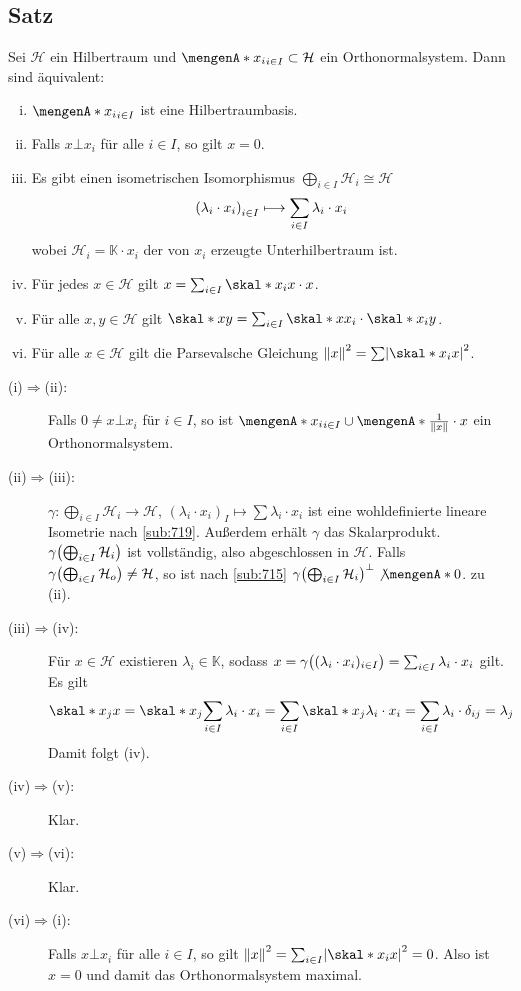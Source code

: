 \subsection{Satz} %
\label{sub:722}
Sei $\mathcal{H}$ ein Hilbertraum und $\set{x_i}_{i \in I} \subset \mathcal{H}$ ein Orthonormalsystem. Dann sind äquivalent: 
\begin{enumerate}[(i)]
	\item $\set{x_i}_{i \in I}$ ist eine Hilbertraumbasis. 
	\item Falls $x \bot x_i$ für alle $i \in I$, so gilt $x=0$.
	\item Es gibt einen isometrischen Isomorphismus $\bigoplus_{i \in I} \mathcal{H}_i \cong \mathcal{H}$ 
	\[
		\enbrace*{\lambda_i \cdot x_i}_{i \in I} \longmapsto \sum_{i \in I} \lambda_i \cdot x_i 
	\]
	wobei $\mathcal{H}_i = \mathds{K} \cdot x_i$ der von $x_i$ erzeugte Unterhilbertraum ist.
	\item Für jedes $x \in \mathcal{H}$ gilt $x= \sum_{i \in I} \skal*{x_i}{x} \cdot x$.
	\item Für alle $x,y \in \mathcal{H}$ gilt $\skal*{x}{y} = \sum_{i \in I} \skal*{x}{x_i} \cdot \skal*{x_i}{y}$.
	\item Für alle $x \in \mathcal{H}$ gilt die Parsevalsche Gleichung $\norm{x}^2 = \sum \abs*{\skal*{x_i}{x}}^2$.
\end{enumerate}
\begin{description}
	\item[(i)$\Rightarrow$(ii):] Falls $0 \not= x \bot x_i$ für $i \in I$, so ist $\set{x_i}_{i \in I} \cup \set{\frac{1}{\norm{x}} \cdot x}$ ein Orthonormalsystem. \light
	\item[(ii)$\Rightarrow$(iii):] $\gamma \colon \bigoplus_{i \in I} \mathcal{H}_i \to \mathcal{H}$, $(\lambda_i \cdot x_i)_I \mapsto \sum \lambda_i \cdot x_i$ ist eine
	wohldefinierte lineare Isometrie nach \ref{sub:719}. Außerdem erhält $\gamma$ das Skalarprodukt. $\gamma \enbrace*{\bigoplus_{i \in I} \mathcal{H}_i}$ ist vollständig,
	also abgeschlossen in $\mathcal{H}$. Falls $\gamma \enbrace*{\bigoplus_{i\in I} \mathcal{H}_o} \not= \mathcal{H}$, so ist nach \ref{sub:715} 
	$\gamma \enbrace*{\bigoplus_{i \in I} \mathcal{H}_i}^\bot \not \set{0}$. \light zu (ii). 
	\item[(iii)$\Rightarrow$(iv):] Für $x \in \mathcal{H}$ existieren $\lambda_i \in \mathds{K}$,  sodass 
	$x= \gamma \enbrace[\big]{(\lambda_i \cdot x_i)_{i \in I}} = \sum_{i \in I} \lambda_i \cdot x_i$ gilt. Es gilt 
	\begin{align*}
		\skal*{x_j}{x} = \skal*{x_j}{\sum_{i \in I} \lambda_i \cdot x_i} = \sum_{i \in I} \skal*{x_j}{\lambda_i \cdot x_i} = \sum_{i\in I} \lambda_i \cdot \delta_{ij} = \lambda_j
	\end{align*}
	Damit folgt (iv).
	\item[(iv)$\Rightarrow$(v):] Klar.
	\item[(v)$\Rightarrow$(vi):] Klar.
	\item[(vi)$\Rightarrow$(i):] Falls $x \bot x_i$ für alle $i \in I$, so gilt $\norm{x}^2= \sum_{i \in I} \abs*{\skal*{x_i}{x}}^2 =0$. Also ist $x=0$ und damit das 
	Orthonormalsystem maximal. \bewende
\end{description}

